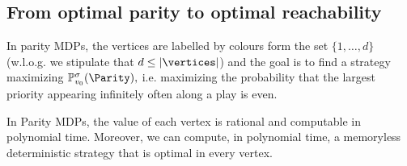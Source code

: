 \subsection*{From optimal parity to optimal reachability}

In parity MDPs, the vertices are labelled by colours form the set $\{1,\dots,d\}$ (w.l.o.g. we stipulate that $d\leq |\vertices|$) and the goal is to find a strategy maximizing $ \probm^\sigma_{\vinit}(\Parity),$ i.e. maximizing the probability that the largest priority appearing infinitely often along a play is even.

\begin{theorem}
\label{5-thm:parity-main}
In Parity MDPs, the value of each vertex is rational and computable in polynomial time. Moreover, we can compute, in polynomial time, a memoryless deterministic strategy that is optimal in every vertex.
\end{theorem}
